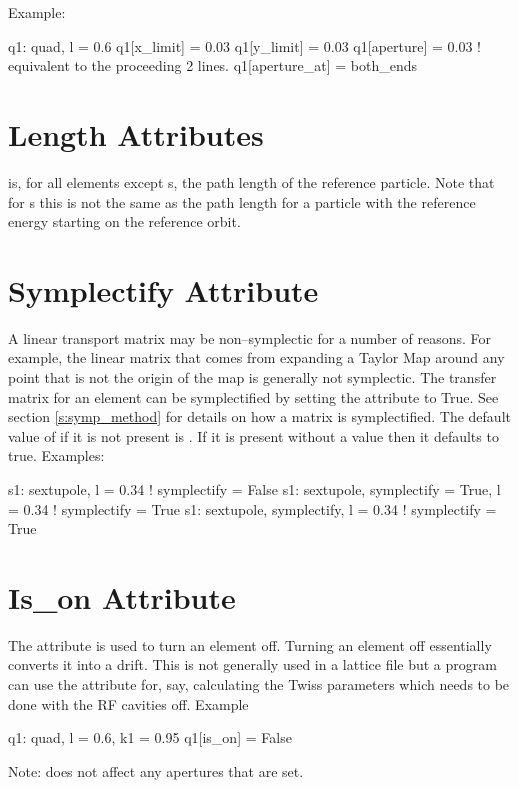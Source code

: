 Example:
\begin{example}
  q1: quad, l = 0.6
  q1[x_limit] = 0.03
  q1[y_limit] = 0.03
  q1[aperture] = 0.03  ! equivalent to the proceeding 2 lines.  
  q1[aperture_at] = both_ends
\end{example}

\section{Length Attributes}
\label{s:l}

 is, for all elements except s, the path length of
the reference particle.  Note that for s this is not the
same as the path length for a particle with the reference energy
starting on the reference orbit.

\section{Symplectify Attribute}
\label{s:symp}

A linear transport matrix may be non--symplectic for a number of reasons.
For example, the linear matrix that comes from expanding a Taylor Map
around any point that is not the origin of the map is generally not 
symplectic. The transfer matrix for an element can be symplectified by
setting the  attribute to True. See section \ref{s:symp_method}
for details on how a matrix is symplectified. The default value of  
if it is not present is . If it is present without a value then
it defaults to true. Examples:
\begin{example}
  s1: sextupole, l = 0.34                       ! symplectify = False
  s1: sextupole, symplectify = True, l = 0.34   ! symplectify = True
  s1: sextupole, symplectify, l = 0.34          ! symplectify = True
\end{example}

\section{Is\_on Attribute}
\label{s:is_on}

The  attribute is used to turn an element off. Turning
an element off essentially converts it into a drift. This is not
generally used in a lattice file but a program can use the attribute
for, say, calculating the Twiss parameters which needs to be done
with the RF cavities off. Example
\begin{example}
  q1: quad, l = 0.6, k1 = 0.95
  q1[is_on] = False
\end{example}
Note:  does not affect any apertures that are set.

